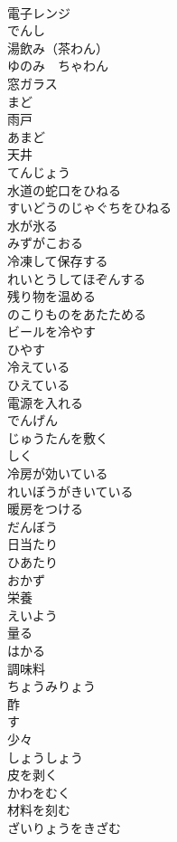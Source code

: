 \documentclass[8pt]{extreport}
\begin{document}
\begin{CJK}{UTF8}{min}
\\	電子レンジ	
\\	でんし
\\	湯飲み（茶わん）	
\\	ゆのみ　ちゃわん
\\	窓ガラス	
\\	まど
\\	雨戸	
\\	あまど
\\	天井	
\\	てんじょう
\\	水道の蛇口をひねる	
\\	すいどうのじゃぐちをひねる
\\	水が氷る	
\\	みずがこおる
\\	冷凍して保存する	
\\	れいとうしてほぞんする
\\	残り物を温める	
\\	のこりものをあたためる
\\	ビールを冷やす	
\\	ひやす
\\	冷えている	
\\	ひえている
\\	電源を入れる	
\\	でんげん
\\	じゅうたんを敷く	
\\	しく
\\	冷房が効いている	
\\	れいぼうがきいている
\\	暖房をつける	
\\	だんぼう
\\	日当たり	
\\	ひあたり
\\	おかず	
\\	栄養	
\\	えいよう
\\	量る	
\\	はかる
\\	調味料	
\\	ちょうみりょう
\\	酢	
\\	す
\\	少々	
\\	しょうしょう
\\	皮を剥く	
\\	かわをむく
\\	材料を刻む	
\\	ざいりょうをきざむ

\end{CJK}
\end{document}
